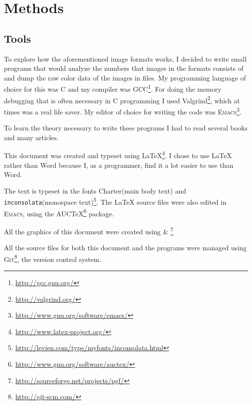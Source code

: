 \begin{comment}
  
\end{comment}

\chapter{Methods}
\label{cha:method}

\newcommand{\CC}{C\nolinebreak\hspace{-.05em}\raisebox{.4ex}{\tiny\bf +}\nolinebreak\hspace{-.10em}\raisebox{.4ex}{\tiny\bf +}}

\section{Tools}

\newcommand{\credits}[1]{\footnote{\url{#1}}}

To explore how the aforementioned image formats works, I decided to
write small programs that would analyze the numbers that images in the
formats consists of and dump the raw color data of the images in
files. My programming language of choice for this was \CC{} and my
compiler was GCC\credits{http://gcc.gnu.org/}. For doing the memory
debugging that is often necessary in \CC{} programming I used
Valgrind\credits{http://valgrind.org/}, which at times was a real life
saver. My editor of choice for writing the code was \textsc{Emacs}\credits{http://www.gnu.org/software/emacs/}.

To learn the theory necessary to write these programs I had to read
several books and many articles.

This document was created and typeset using
\LaTeX{}\credits{http://www.latex-project.org/}. I chose to use
\LaTeX{} rather than Word because I, as a programmer, find it a lot
easier to use than Word.

The text is typeset in the fonts Charter(main body text) and
\texttt{inconsolata}(monospace text)\credits{http://levien.com/type/myfonts/inconsolata.html}. The \LaTeX{} source files were
also edited in \textsc{Emacs}, using the AUC\TeX{}\credits{http://www.gnu.org/software/auctex/} package.

All the graphics of this document were created using
\tikzname \& \pgf\credits{http://sourceforge.net/projects/pgf/}

All the source files for both this document and the programs were
managed using \textsc{Git}\credits{http://git-scm.com/}, the version control system.


